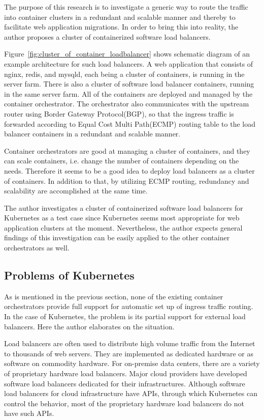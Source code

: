 The purpose of this research is to investigate a generic way to route the traffic into container clusters in a redundant and scalable manner and thereby to facilitate web application migrations.
In order to bring this into reality, the author proposes a cluster of containerized software load balancers.

Figure~\ref{fig:cluster_of_container_loadbalancer} shows schematic diagram of an example architecture for such load balancers.
A web application that consists of nginx, redis, and mysqld, each being a cluster of containers, is running in the server farm.
There is also a cluster of software load balancer containers, running in the same server farm. 
All of the containers are deployed and managed by the container orchestrator.
The orchestrator also communicates with the upstream router using Border Gateway Protocol(BGP), so that the ingress traffic is forwarded according to Equal Cost Multi Path(ECMP) routing table to the load balancer containers in a redundant and scalable manner.

Container orchestrators are good at managing a cluster of containers, and they can scale containers, i.e. change the number of containers depending on the needs.
Therefore it seems to be a good idea to deploy load balancers as a cluster of containers.
In addition to that, by utilizing ECMP routing, redundancy and scalability are accomplished at the same time.

The author investigates a cluster of containerized software load balancers for Kubernetes as a test case since Kubernetes seems most appropriate for web application clusters at the moment.
Nevertheless, the author expects general findings of this investigation can be easily applied to the other container orchestrators as well.

\subsection{Problems of Kubernetes}

As is mentioned in the previous section, none of the existing container orchestrators provide full support for automatic set up of ingress traffic routing.
In the case of Kubernetes, the problem is its partial support for external load balancers.
Here the author elaborates on the situation.

Load balancers are often used to distribute high volume traffic from the Internet to thousands of web servers.
They are implemented as dedicated hardware or as software on commodity hardware.
For on-premise data centers, there are a variety of proprietary hardware load balancers.
Major cloud providers have developed software load balancers\cite{eisenbud2016maglev,patel2013ananta} dedicated for their infrastructures.
Although software load balancers for cloud infrastructure have APIs, through which Kubernetes can control the behavior, most of the proprietary hardware load balancers do not have such APIs.

